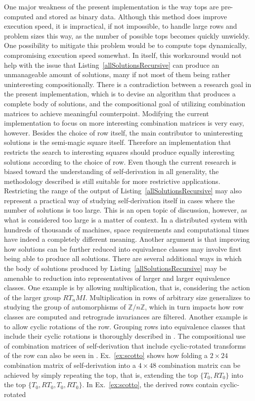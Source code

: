 One major weakness of the present implementation is the way tops are pre-computed and stored as binary data. Although this method does improve execution speed, it is impractical, if not impossible, to handle large rows and problem sizes this way, as the number of possible tops becomes quickly unwieldy. One possibility to mitigate this problem would be to compute tops dynamically, compromising execution speed somewhat. In itself, this workaround would not help with the issue that Listing~\ref{allSolutionsRecursive} can produce an unmanageable amount of solutions, many if not most of them being rather uninteresting compositionally. There is a contradiction between a research goal in the present implementation, which is to devise an algorithm that produces a complete body of solutions, and the compositional goal of utilizing combination matrices to achieve meaningful counterpoint. Modifying the current implementation to focus on more interesting combination matrices is very easy, however. Besides the choice of row itself, the main contributor to uninteresting solutions is the semi-magic square itself. Therefore an implementation that restricts the search to interesting squares should produce equally interesting solutions according to the choice of row. Even though the current research is biased toward the understanding of self-derivation in all generality, the methodology described is still suitable for more restrictive applications. Restricting the range of the output of Listing~\ref{allSolutionsRecursive} may also represent a practical way of studying self-derivation itself in cases where the number of solutions is too large. This is an open topic of discussion, however, as what is considered too large is a matter of context. In a distributed system with hundreds of thousands of machines, space requirements and computational times have indeed a completely different meaning. Another argument is that improving how solutions can be further reduced into equivalence classes may involve first being able to produce all solutions. There are several additional ways in which the body of solutions produced by Listing~\ref{allSolutionsRecursive} may be amenable to reduction into representatives of larger and larger equivalence classes. One example is by allowing multiplication, that is, considering the action of the larger group $RT_nMI$. Multiplication in rows of arbitrary size generalizes to studying the group of automorphisms of $\mathbb{Z} / n \mathbb{Z}$, which in turn impacts how row classes are computed and retrograde invariances are filtered. Another example is to allow cyclic rotations of the row. Grouping rows into equivalence classes that include their cyclic rotations is thoroughly described in \cite{FripertingerLackner2015}. The compositional use of combination matrices of self-derivation that include cyclic-rotated transforms of the row can also be seen in \cite{Scotto2000}. Ex.~\ref{ex:scotto} shows how folding a $2 \times 24$ combination matrix of self-derivation into a $4 \times 48$ combination matrix can be achieved by simply repeating the top, that is, extending the top $\{T_0, RT_0\}$ into the top $\{T_0, RT_0, T_0, RT_0\}$. In Ex.~\ref{ex:scotto}, the derived rows contain cyclic-rotated 